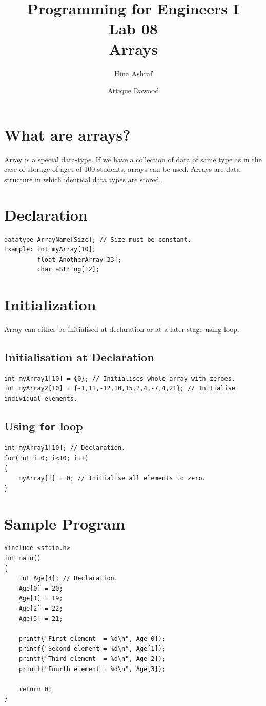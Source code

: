 \documentclass{article}
\title{Programming for Engineers I\\Lab 08\\Arrays}
\author{Hina Ashraf\and Attique Dawood}
\begin{document}
\maketitle
\section{What are arrays?}
Array is a special data-type. If we have a collection of data of same type as in the case of storage of ages of 100 students, arrays can be used. Arrays are data structure in which identical data types are stored.
\section{Declaration}
\begin{lstlisting}[caption={Array declaration}]
datatype ArrayName[Size]; // Size must be constant.
Example: int myArray[10];
         float AnotherArray[33];
         char aString[12];
\end{lstlisting}
\section{Initialization}
Array can either be initialised at declaration or at a later stage using loop.
\subsection{Initialisation at Declaration}
\begin{lstlisting}[caption={Array initialisation at declaration}]
int myArray1[10] = {0}; // Initialises whole array with zeroes.
int myArray2[10] = {-1,11,-12,10,15,2,4,-7,4,21}; // Initialise individual elements.
\end{lstlisting}
\subsection{Using \texttt{for} loop}
\begin{lstlisting}[caption={Array initialisation using for loop}]
int myArray1[10]; // Declaration.
for(int i=0; i<10; i++)
{
    myArray[i] = 0; // Initialise all elements to zero.
}
\end{lstlisting}
\section{Sample Program}
\begin{lstlisting}[caption={Sample program}]
#include <stdio.h>
int main()
{
    int Age[4]; // Declaration.
    Age[0] = 20;
    Age[1] = 19;
    Age[2] = 22;
    Age[3] = 21;

    printf{"First element  = %d\n", Age[0]);
    printf{"Second element = %d\n", Age[1]);
    printf{"Third element  = %d\n", Age[2]);
    printf{"Fourth element = %d\n", Age[3]);

    return 0;
}
\end{lstlisting}
\end{document}
